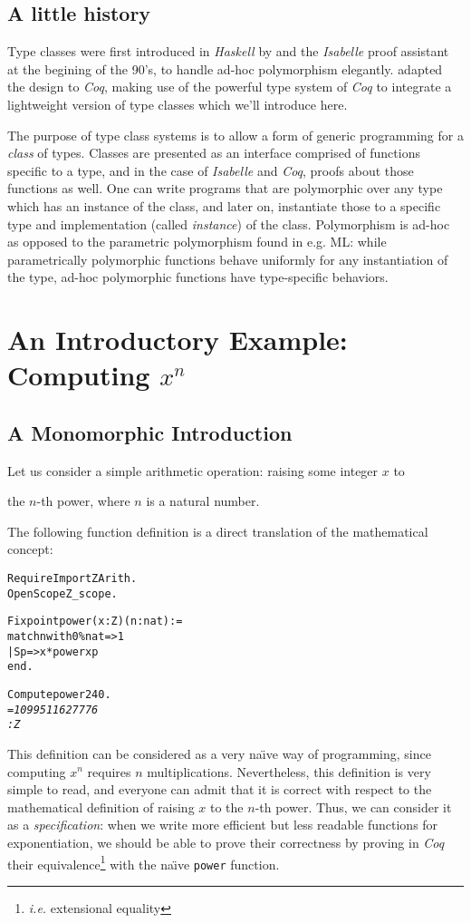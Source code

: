 \documentclass[a4]{report}
\newcommand{\coq}{\mbox{\emph{Coq}}}
\newcommand{\isabelle}{\mbox{\emph{Isabelle}}}
\newcommand{\haskell}{\mbox{\emph{Haskell}}}
\begin{document}
\section{A little history}

Type classes were first introduced in {\haskell} by \citet{WadlerBlott89} and the {\isabelle} proof
assistant \citep{DBLP:conf/fpca/NipkowS91} at the begining of the
90's, to handle ad-hoc polymorphism
elegantly. \cite{DBLP:conf/tphol/SozeauO08} adapted the design to
{\coq}, making use of the powerful type system of {\coq} to integrate a
lightweight version of type classes which we'll introduce here.

The purpose of type class systems is to allow a form of generic
programming for a \emph{class} of types. Classes are presented as an
interface comprised of functions specific to a type, and in the case of
{\isabelle} and {\coq}, proofs about those functions as well. One can
write programs that are polymorphic over any type which has an instance
of the class, and later on, instantiate those to a specific type and
implementation (called \emph{instance}) of the class. Polymorphism is
ad-hoc as opposed to the parametric polymorphism found in e.g. ML:
while parametrically polymorphic functions behave uniformly for any
instantiation of the type, ad-hoc polymorphic functions have
type-specific behaviors. 

\chapter{An Introductory Example: Computing $x^n$}
\section{A Monomorphic Introduction}
Let us consider a simple arithmetic operation: raising some integer $x$ to

the $n$-th power, where $n$ is a natural number.

The following function definition is a direct translation of the mathematical
concept:
\begin{alltt}
Require Import ZArith.
Open Scope Z_scope.

Fixpoint power (x:Z)(n:nat) :=
  match n with 0\%nat => 1
             | S p =>  x * power x p
  end.

Compute power 2 40.\it\color{answercolor}
    =  1099511627776
     : Z
\end{alltt}

This definition can be considered as a very na\"{\i}ve way of programming,
since computing $x^n$ requires $n$ multiplications. 
 Nevertheless, this definition is 
very simple to read, and everyone can admit that it is  correct 
with respect to the mathematical definition of raising $x$ to the $n$-th power.
Thus, we can consider it as a \emph{specification}: when we write 
more efficient but less readable functions for exponentiation,
 we should be able
to prove their correctness by proving in \coq{} their equivalence\footnote{\emph{i.e.} extensional equality} 
with the na\"{\i}ve \texttt{power} function.
\end{document}
